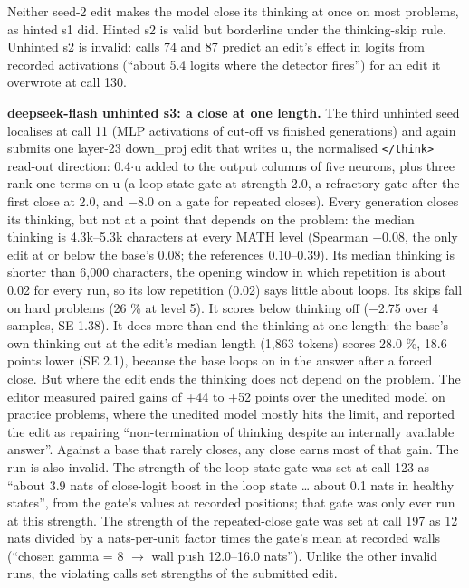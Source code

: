 \documentclass[
  10pt,
]{article}
\newcommand{\passthrough}[1]{#1}
\begin{document}
Neither seed-2 edit makes the model close its thinking at once on most
problems, as hinted s1 did. Hinted s2 is valid but borderline under the
thinking-skip rule. Unhinted s2 is invalid: calls 74 and 87 predict an
edit's effect in logits from recorded activations (``about 5.4 logits
where the detector fires'') for an edit it overwrote at call 130.

\textbf{deepseek-flash unhinted s3: a close at one length.} The third
unhinted seed localises at call 11 (MLP activations of cut-off vs
finished generations) and again submits one layer-23 down\_proj edit
that writes u, the normalised \passthrough{\lstinline!</think>!}
read-out direction: 0.4\ensuremath{\cdot}u added to the output columns of five neurons,
plus three rank-one terms on u (a loop-state gate at strength 2.0, a
refractory gate after the first close at 2.0, and \ensuremath{-}8.0 on a gate for
repeated closes). Every generation closes its thinking, but not at a
point that depends on the problem: the median thinking is 4.3k--5.3k
characters at every MATH level (Spearman \ensuremath{-}0.08, the only edit at or
below the base's 0.08; the references 0.10--0.39). Its median thinking
is shorter than 6,000 characters, the opening window in which repetition
is about 0.02 for every run, so its low repetition (0.02) says little
about loops. Its skips fall on hard problems (26 \% at level 5). It
scores below thinking off (\ensuremath{-}2.75 over 4 samples, SE 1.38). It does more
than end the thinking at one length: the base's own thinking cut at the
edit's median length (1,863 tokens) scores 28.0 \%, 18.6 points lower
(SE 2.1), because the base loops on in the answer after a forced close.
But where the edit ends the thinking does not depend on the problem. The
editor measured paired gains of +44 to +52 points over the unedited
model on practice problems, where the unedited model mostly hits the
limit, and reported the edit as repairing ``non-termination of thinking
despite an internally available answer''. Against a base that rarely
closes, any close earns most of that gain. The run is also invalid. The
strength of the loop-state gate was set at call 123 as ``about 3.9 nats
of close-logit boost in the loop state \ldots{} about 0.1 nats in
healthy states'', from the gate's values at recorded positions; that
gate was only ever run at this strength. The strength of the
repeated-close gate was set at call 197 as 12 nats divided by a
nats-per-unit factor times the gate's mean at recorded walls (``chosen
gamma = 8 \ensuremath{\rightarrow} wall push 12.0--16.0 nats''). Unlike the other invalid runs,
the violating calls set strengths of the submitted edit.
\end{document}
